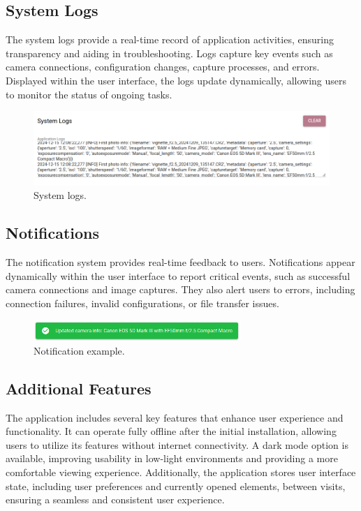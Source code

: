 \subsection{System Logs}

The system logs provide a real-time record of application activities, ensuring transparency and aiding in troubleshooting. Logs capture key events such as camera connections, configuration changes, capture processes, and errors. Displayed within the user interface, the logs update dynamically, allowing users to monitor the status of ongoing tasks.

\begin{figure}[h]
\centering
\includegraphics[width=1\textwidth]{Images/system_logs.png}
\caption{System logs.}
\label{fig:ui_system_logs}
\end{figure}

\subsection{Notifications}

The notification system provides real-time feedback to users. Notifications appear dynamically within the user interface to report critical events, such as successful camera connections and image captures. They also alert users to errors, including connection failures, invalid configurations, or file transfer issues.

\begin{figure}[h]
\centering
\includegraphics[width=0.7\textwidth]{Images/notification.png}
\caption{Notification example.}
\label{fig:ui_notification}
\end{figure}

\subsection{Additional Features}

The application includes several key features that enhance user experience and functionality. It can operate fully offline after the initial installation, allowing users to utilize its features without internet connectivity. A dark mode option is available, improving usability in low-light environments and providing a more comfortable viewing experience. Additionally, the application stores user interface state, including user preferences and currently opened elements, between visits, ensuring a seamless and consistent user experience.


